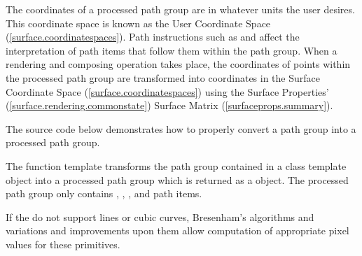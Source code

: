 \pnum
\enternote
The coordinates of a processed path group are in whatever units the user desires. This coordinate space is known as the User Coordinate Space (\ref{surface.coordinatespaces}). Path instructions such as  and  affect the interpretation of path items that follow them within the path group. When a rendering and composing operation takes place, the coordinates of points within the processed path group are transformed into coordinates in the Surface Coordinate Space (\ref{surface.coordinatespaces}) using the Surface Properties' (\ref{surface.rendering.commonstate}) Surface Matrix (\ref{surfaceprops.summary}).
\exitnote

\pnum
The source code below demonstrates how to properly convert a path group into a processed path group.

\pnum
The  function template transforms the path group contained in a  class template object into a processed path group which is returned as a  object. The processed path group only contains , , , and  path items.

\pnum
\enternote
If the \underlyingrendandpresenttechs do not support lines or cubic \bezierlocal curves, Bresenham's algorithms and variations and improvements upon them allow computation of appropriate pixel values for these primitives.
\exitnote
\\



\addtocounter{SectionDepthBase}{1}




















\addtocounter{SectionDepthBase}{-1}
